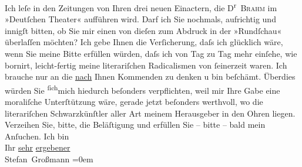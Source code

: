 \begin{ledgroupsized}[t]{13cm}
           Ich leſe in den Zeitungen von \introOben{}Ihren\introOben{} drei neuen Einactern, die D\textsuperscript{r} \textsc{Brahm} im »Deutſchen Theater« aufführen wird.\pend
           \pstart
           Darf ich Sie nochmals, aufrichtig und innigſt bitten, ob Sie mir einen von dieſen zum
               Abdruck in der »Rundſchau« überlaſſen möchten?
               Ich gebe Ihnen die Verſicherung, daſs ich glücklich wäre, wenn Sie meine Bitte
               erfüllen würden, daſs ich von Tag zu Tag \strikeout{\textcolor{gray}{×}\-\textcolor{gray}{×}} mehr einſehe, wie bornirt, leicht-fertig meine  literariſchen Radicalismen von ſeinerzeit waren. Ich brauche nur an
               die \uline{nach} Ihnen Kommenden zu denken u bin
               beſchämt.\pend
           \pstart
           Überdies würden Sie \substVorne{}\textsuperscript{ſich}\substDazwischen{}mich\substHinten{} hiedurch beſonders verpflichten, weil mir Ihre Gabe eine moraliſche Unter{\pb}ſtützung wäre, gerade jetzt beſonders
               werthvoll, wo die literariſchen Schwarzkünſtler aller Art meinem Herausgeber in den Ohren
               liegen.\pend
           \pstart
           Verzeihen Sie, bitte, die Beläſtigung und erfüllen Sie – bitte – bald mein
               Anſuchen.\pend
           \pstart
           Ich bin{\\[\baselineskip]} Ihr \uline{sehr}{ }\uline{ergebener}{\\[\baselineskip]}\spacefill\mbox{Stefan Großmann}\pend
           \leftskip=0em{}
         
         \endnumbering{}\end{ledgroupsized}  \newcommand{\dateiname}{L00847}\newcommand{\titel}{Stefan Großmann an Arthur Schnitzler, 16. 9. 1898}\newcommand{\editorInnen}{ Martin Anton Müller und Gerd-Hermann Susen}
      